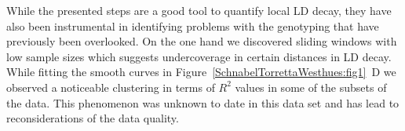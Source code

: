 \documentclass[twoside]{report}
\begin{document}
While the presented steps are a good tool to quantify local LD decay, they have also been 
	instrumental in identifying problems with the genotyping that have previously been 
	overlooked. On the one hand we discovered sliding windows with low sample sizes which suggests 
	undercoverage in certain distances in LD decay. 
	While fitting the smooth curves in Figure~\ref{SchnabelTorrettaWesthues:fig1}~D we observed a noticeable clustering 
	in terms of $R^2$ values in some of the subsets of the data. This phenomenon was unknown 
	to date in this data set and has lead to reconsiderations of the data quality.




%
%
\end{document}
